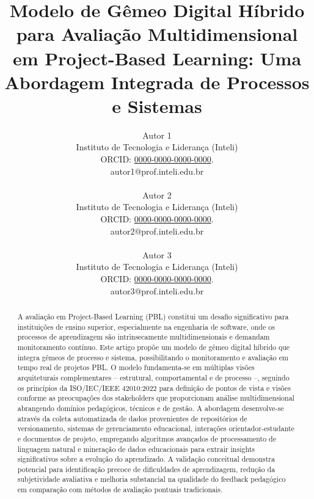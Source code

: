 \documentclass[english, spanish, brazilian]{modelo_dt}
\title{Modelo de Gêmeo Digital Híbrido para Avaliação Multidimensional em Project-Based Learning: Uma Abordagem Integrada de Processos e Sistemas}
\author{%
	Autor 1\\
	Instituto de Tecnologia e Liderança (Inteli)\\
	ORCID: \href{https://orcid.org/0000-0000-0000-0000}{0000-0000-0000-0000}\@.\\
	autor1@prof.inteli.edu.br\\
	\\
	Autor 2\\
	Instituto de Tecnologia e Liderança (Inteli)\\
	ORCID: \href{https://orcid.org/0000-0000-0000-0000}{0000-0000-0000-0000}\@.\\
	autor2@prof.inteli.edu.br\\
	\\
	Autor 3\\
	Instituto de Tecnologia e Liderança (Inteli)\\
	ORCID: \href{https://orcid.org/0000-0000-0000-0000}{0000-0000-0000-0000}\@.\\
	autor3@prof.inteli.edu.br
}
\begin{document}
\maketitle

\begin{otherlanguage}{brazilian}
  \renewcommand{\abstractname}{Resumo}
  \begin{abstract}
    A avaliação em Project-Based Learning (PBL) constitui um desafio significativo para instituições de ensino superior, especialmente na engenharia de software, onde os processos de aprendizagem são intrinsecamente multidimensionais e demandam monitoramento contínuo. Este artigo propõe um modelo de gêmeo digital híbrido que integra gêmeos de processo e sistema, possibilitando o monitoramento e avaliação em tempo real de projetos PBL. O modelo fundamenta-se em múltiplas visões arquiteturais complementares -- estrutural, comportamental e de processo --, seguindo os princípios da ISO/IEC/IEEE 42010:2022 para definição de pontos de vista e visões conforme as preocupações dos stakeholders que proporcionam análise multidimensional abrangendo domínios pedagógicos, técnicos e de gestão. A abordagem desenvolve-se através da coleta automatizada de dados provenientes de repositórios de versionamento, sistemas de gerenciamento educacional, interações orientador-estudante e documentos de projeto, empregando algoritmos avançados de processamento de linguagem natural e mineração de dados educacionais para extrair insights significativos sobre a evolução do aprendizado. A validação conceitual demonstra potencial para identificação precoce de dificuldades de aprendizagem, redução da subjetividade avaliativa e melhoria substancial na qualidade do feedback pedagógico em comparação com métodos de avaliação pontuais tradicionais.
  \end{abstract}
\end{otherlanguage}
\end{document}
